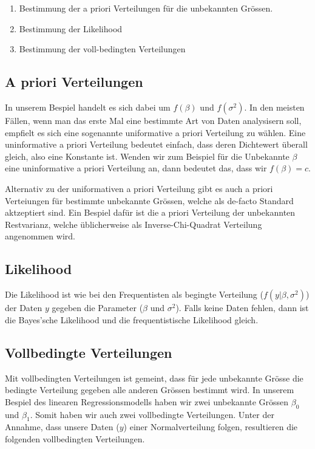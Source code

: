 \documentclass[]{book}
\providecommand{\tightlist}{%
  \setlength{\itemsep}{0pt}\setlength{\parskip}{0pt}}
\begin{document}
\begin{enumerate}
\def\labelenumi{\arabic{enumi}.}
\tightlist
\item
  Bestimmung der a priori Verteilungen für die unbekannten Grössen.
\item
  Bestimmung der Likelihood
\item
  Bestimmung der voll-bedingten Verteilungen
\end{enumerate}

\subsection{A priori Verteilungen}\label{a-priori-verteilungen}

In unserem Bespiel handelt es sich dabei um \(f(\beta)\) und
\(f(\sigma^2)\). In den meisten Fällen, wenn man das erste Mal eine
bestimmte Art von Daten analysisern soll, empfielt es sich eine
sogenannte uniformative a priori Verteilung zu wählen. Eine
uninformative a priori Verteilung bedeutet einfach, dass deren
Dichtewert überall gleich, also eine Konstante ist. Wenden wir zum
Beispiel für die Unbekannte \(\beta\) eine uninformative a priori
Verteilung an, dann bedeutet das, dass wir \(f(\beta) = c\).

Alternativ zu der uniformativen a priori Verteilung gibt es auch a
priori Verteiungen für bestimmte unbekannte Grössen, welche als de-facto
Standard aktzeptiert sind. Ein Bespiel dafür ist die a priori Verteilung
der unbekannten Restvarianz, welche üblicherweise als
Inverse-Chi-Quadrat Verteilung angenommen wird.

\subsection{Likelihood}\label{likelihood}

Die Likelihood ist wie bei den Frequentisten als begingte Verteilung
(\(f(y | \beta, \sigma^2)\)) der Daten \(y\) gegeben die Parameter
(\(\beta\) und \(\sigma^2\)). Falls keine Daten fehlen, dann ist die
Bayes'sche Likelihood und die frequentistische Likelihood gleich.

\subsection{Vollbedingte Verteilungen}\label{vollbedingte-verteilungen}

Mit vollbedingten Verteilungen ist gemeint, dass für jede unbekannte
Grösse die bedingte Verteilung gegeben alle anderen Grössen bestimmt
wird. In unserem Bespiel des linearen Regressionsmodells haben wir zwei
unbekannte Grössen \(\beta_0\) und \(\beta_1\). Somit haben wir auch
zwei vollbedingte Verteilungen. Unter der Annahme, dass unsere Daten
(\(y\)) einer Normalverteilung folgen, resultieren die folgenden
vollbedingten Verteilungen.
\end{document}
